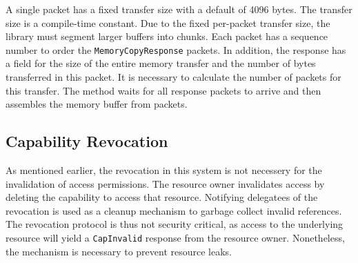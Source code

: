 A single  packet has a fixed transfer size with a default of 4096 bytes. The transfer size is a compile-time constant. Due to the fixed per-packet transfer size, the library must segment larger buffers into chunks. Each packet has a sequence number to order the \texttt{MemoryCopyResponse} packets. In addition, the response has a field for the size of the entire memory transfer and the number of bytes transferred in this packet. It is necessary to calculate the number of packets for this transfer. The  method waits for all response packets to arrive and then assembles the memory buffer from packets.

\subsection{Capability Revocation}\label{sec:impl:revocation}
As mentioned earlier, the revocation in this system is not necessery for the invalidation of access permissions. The resource owner invalidates access by deleting the capability to access that resource. Notifying delegatees of the revocation is used as a cleanup mechanism to garbage collect invalid references. The revocation protocol is thus not security critical, as access to the underlying resource will yield a \texttt{CapInvalid} response from the resource owner. Nonetheless, the mechanism is necessary to prevent resource leaks.

